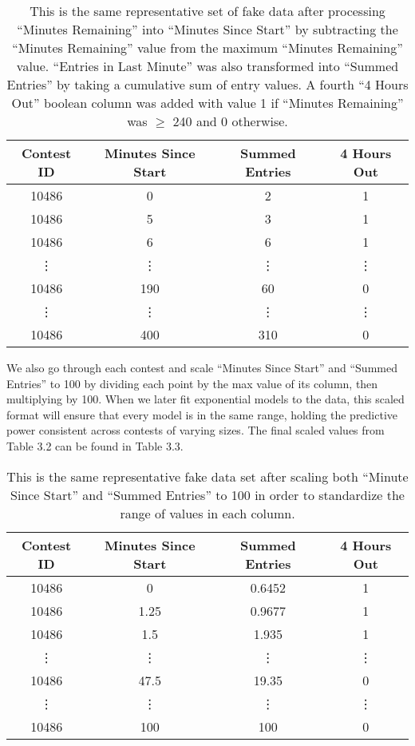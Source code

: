 \begin{table}
\begin{center}
\begin{tabular}{| c | c | c | c |}
\hline
 \textbf{Contest ID} & \textbf{Minutes Since Start} & \textbf{Summed Entries} & \textbf{4 Hours Out} \\ 
 \hline
 10486 & 0 & 2 & 1 \\  
 \hline
 10486 & 5 & 3 & 1 \\
 \hline
 10486 & 6 & 6 & 1 \\
 \hline
 \vdots & \vdots & \vdots & \vdots \\
 \hline
 10486 & 190 & 60 & 0 \\
 \hline
 \vdots & \vdots & \vdots & \vdots \\
 \hline
 10486 & 400 & 310 & 0 \\
 \hline
\end{tabular}
\caption[Basic Transformation of Time Series Data]{This is the same representative set of fake data after processing ``Minutes Remaining'' into ``Minutes Since Start'' by subtracting the ``Minutes Remaining'' value from the maximum ``Minutes Remaining'' value. ``Entries in Last Minute'' was also transformed into ``Summed Entries'' by taking a cumulative sum of entry values. A fourth ``4 Hours Out'' boolean column was added with value 1 if ``Minutes Remaining'' was $\geq$ 240 and 0 otherwise.}
\end{center}
\end{table}

We also go through each contest and scale ``Minutes Since Start'' and ``Summed Entries'' to 100 by dividing each point by the max value of its column, then multiplying by 100. When we later fit exponential models to the data, this scaled format will ensure that every model is in the same range, holding the predictive power consistent across contests of varying sizes.  The final scaled values from Table 3.2 can be found in Table 3.3.

\begin{table}
\begin{center}
\begin{tabular}{| c | c | c | c |}
\hline
 \textbf{Contest ID} & \textbf{Minutes Since Start} & \textbf{Summed Entries} & \textbf{4 Hours Out} \\ 
 \hline
 10486 & 0 & 0.6452 & 1 \\  
 \hline
 10486 & 1.25 & 0.9677 & 1 \\
 \hline
 10486 & 1.5 & 1.935 & 1 \\
 \hline
 \vdots & \vdots & \vdots & \vdots \\
 \hline
 10486 & 47.5 & 19.35 & 0 \\
 \hline
 \vdots & \vdots & \vdots & \vdots \\
 \hline
 10486 & 100 & 100 & 0 \\
 \hline
\end{tabular}
\caption[Time Series Data with Summed Entries]{This is the same representative fake data set after scaling both ``Minute Since Start'' and ``Summed Entries'' to 100 in order to standardize the range of values in each column.}
\end{center}
\end{table}

